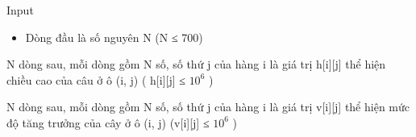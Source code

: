 Input
\begin{itemize}
	\item     Dòng đầu là số nguyên N (N ≤ 700)   
\end{itemize}

   N dòng sau, mỗi dòng gồm N số, số thứ j của hàng i là giá trị h[i][j] thể hiện chiều cao của câu ở ô (i, j) ( h[i][j] ≤ $10^{6}$   )  

   N dòng sau, mỗi dòng gồm N số, số thứ j của hàng i là giá trị v[i][j] thể hiện mức độ tăng trưởng của cây ở ô (i, j) (v[i][j] ≤ $10^{6}$   )